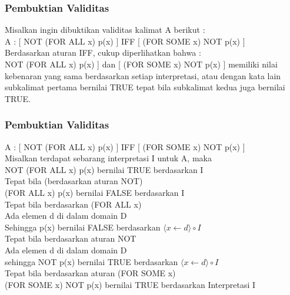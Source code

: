 \documentclass[handout]{beamer}
\theoremstyle{definition}
\theoremstyle{example}
\begin{document}
\begin{frame}
	\frametitle{Pembuktian Validitas}
	Misalkan ingin dibuktikan validitas kalimat A berikut :\\
	A : [ NOT (FOR ALL x) p(x) ] IFF [ (FOR SOME x) NOT p(x) ]\\
	\vspace{2mm}
	Berdasarkan aturan IFF, cukup diperlihatkan bahwa :\\
	NOT (FOR ALL x) p(x) ] dan [ (FOR SOME x) NOT p(x) ] memiliki nilai kebenaran yang sama berdasarkan setiap interpretasi, atau dengan kata lain subkalimat pertama bernilai TRUE tepat bila subkalimat kedua juga bernilai TRUE. 
\end{frame}	

\begin{frame}
	\frametitle{Pembuktian Validitas}
	A : [ NOT (FOR ALL x) p(x) ] IFF [ (FOR SOME x) NOT p(x) ]\\
	\vspace{2mm}
	Misalkan terdapat sebarang interpretasi I untuk A, maka\\
	NOT (FOR ALL x) p(x)  bernilai TRUE berdasarkan I\\
	Tepat bila (berdasarkan aturan NOT)\\
	\hspace{5mm} (FOR ALL x) p(x) bernilai FALSE berdasarkan I\\
	Tepat bila berdasarkan (FOR ALL x)\\
	\hspace{5mm} Ada elemen d di dalam domain D\\
	Sehingga p(x) bernilai FALSE berdasarkan $\langle x \leftarrow d \rangle \circ I $\\	
	Tepat bila berdasarkan aturan NOT\\
	\hspace{5mm} Ada elemen d di dalam domain D\\
	sehingga NOT p(x) bernilai TRUE berdasarkan $\langle x \leftarrow d \rangle \circ I $\\ 
	Tepat bila berdasarkan aturan (FOR SOME x)\\
	\hspace{5mm} (FOR SOME x) NOT p(x) bernilai TRUE berdasarkan Interpretasi I
\end{frame}
\end{document}
